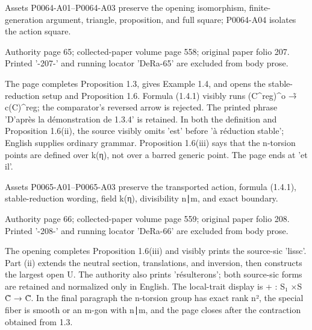 \documentclass[11pt,a4paper]{article}
\begin{document}
Assets P0064-A01--P0064-A03 preserve the opening isomorphism, finite-generation argument, triangle, proposition, and full square; P0064-A04 isolates the action square.


\par\medskip
\hypertarget{D018-P0065}{}
\par\smallskip
Authority page 65; collected-paper volume page 558; original paper folio 207. Printed '-207-' and running locator 'DeRa-65' are excluded from body prose.

The page completes Proposition 1.3, gives Example 1.4, and opens the stable-reduction setup and Proposition 1.6. Formula (1.4.1) visibly runs (C\textasciicircum{}reg)\textasciicircum{}o →̃ c(C)\textasciicircum{}reg; the comparator's reversed arrow is rejected. The printed phrase 'D'après la démonstration de 1.3.4' is retained. In both the definition and Proposition 1.6(ii), the source visibly omits 'est' before 'à réduction stable'; English supplies ordinary grammar. Proposition 1.6(iii) says that the n-torsion points are defined over k(η), not over a barred generic point. The page ends at 'et il'.

Assets P0065-A01--P0065-A03 preserve the transported action, formula (1.4.1), stable-reduction wording, field k(η), divisibility n∣m, and exact boundary.


\par\medskip
\hypertarget{D018-P0066}{}
\par\smallskip
Authority page 66; collected-paper volume page 559; original paper folio 208. Printed '-208-' and running locator 'DeRa-66' are excluded from body prose.

The opening completes Proposition 1.6(iii) and visibly prints the source-sic 'lissc'. Part (ii) extends the neutral section, translations, and inversion, then constructs the largest open U. The authority also prints 'résulterons'; both source-sic forms are retained and normalized only in English. The local-trait display is + : S₁ ×\textunderscore{}S C̃ → C̃. In the final paragraph the n-torsion group has exact rank n², the special fiber is smooth or an m-gon with n∣m, and the page closes after the contraction obtained from 1.3.
\end{document}
